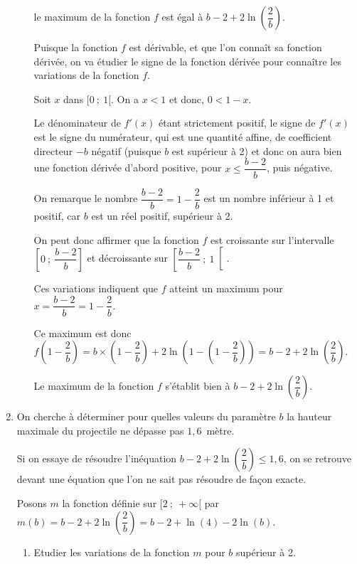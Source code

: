 \documentclass{cornouaille}
\begin{document}
\begin{exercice}
\begin{enumerate}
\begin{enumerate}
le maximum de la fonction $f$ est égal à $b - 2 + 2\ln \left(\dfrac{2}{b}\right)$.

\begin{solution}
Puisque la fonction $f$ est dérivable, et que l'on connaît sa fonction dérivée, on va étudier le signe de la fonction dérivée pour connaître les variations de la fonction $f$.
		
\smallskip
		
Soit $x$ dans $[0~;~1[$. On a $x < 1$ et donc, $0< 1  -x$.
			
Le dénominateur de $f'(x)$ étant strictement positif, le signe de $f'(x)$ est le signe du numérateur, qui est une quantité affine, de coefficient directeur $- b$ négatif (puisque $b$ est supérieur à 2) et donc on aura bien une fonction dérivée d'abord positive, pour $x \leqslant \dfrac{b - 2}{b}$, puis négative.
		
On remarque le nombre $\dfrac{b-2}{b} = 1 - \dfrac{2}{b}$ est un nombre inférieur à 1 et positif, car $b$ est un réel positif, supérieur à 2.
		
On peut donc affirmer que la fonction $f$ est croissante sur l'intervalle $\left[0~;~\dfrac{b - 2}{b}\right] $ et décroissante sur $\left[\dfrac{b - 2}{b}~;~1\right[$. 
		
Ces variations indiquent que $f$ atteint un maximum pour $x = \dfrac{b - 2}{b} = 1 - \dfrac{2}{b}$.
		
Ce maximum est donc $f\left(1 - \dfrac{2}{b}\right) = b\times \left(1 - \dfrac{2}{b}\right) + 2\ln\left(1 - \left(1 - \dfrac{2}{b} \right) \right) = b - 2 + 2 \ln\left(\dfrac{2}{b}\right) $.
		
Le maximum de la fonction $f$ s'établit bien à $b - 2 + 2 \ln\left(\dfrac{2}{b}\right) $.
\end{solution}
\end{enumerate}

\item  On cherche à déterminer pour quelles valeurs du paramètre $b$ la hauteur maximale du projectile ne dépasse
pas $1,6$~mètre.

Si on essaye de résoudre l'inéquation $b - 2 + 2 \ln\left(\dfrac{2}{b}\right) \leqslant 1,6$, on se retrouve devant une équation que l'on ne sait pas résoudre de façon exacte.

Posons $m$ la fonction définie sur $[2~;~+\infty[$ par $m(b) = b - 2 + 2 \ln\left(\dfrac{2}{b}\right) = b - 2 + \ln(4) - 2\ln(b)$.
\begin{enumerate}
	
	\item Etudier les variations de la fonction $m$ pour $b$ supérieur à 2.
	

\end{enumerate}
\end{enumerate}
\end{exercice}
\end{document}

